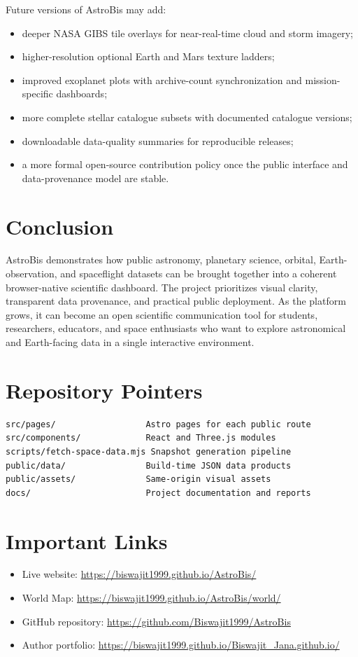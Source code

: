 \documentclass[11pt,a4paper]{article}
\begin{document}
Future versions of AstroBis may add:

\begin{itemize}[leftmargin=*]
  \item deeper NASA GIBS tile overlays for near-real-time cloud and storm imagery;
  \item higher-resolution optional Earth and Mars texture ladders;
  \item improved exoplanet plots with archive-count synchronization and mission-specific dashboards;
  \item more complete stellar catalogue subsets with documented catalogue versions;
  \item downloadable data-quality summaries for reproducible releases;
  \item a more formal open-source contribution policy once the public interface and data-provenance model are stable.
\end{itemize}

\section{Conclusion}

AstroBis demonstrates how public astronomy, planetary science, orbital, Earth-observation, and spaceflight datasets can be brought together into a coherent browser-native scientific dashboard. The project prioritizes visual clarity, transparent data provenance, and practical public deployment. As the platform grows, it can become an open scientific communication tool for students, researchers, educators, and space enthusiasts who want to explore astronomical and Earth-facing data in a single interactive environment.

\appendix
\section{Repository Pointers}

\begin{lstlisting}[style=astrobis]
src/pages/                  Astro pages for each public route
src/components/             React and Three.js modules
scripts/fetch-space-data.mjs Snapshot generation pipeline
public/data/                Build-time JSON data products
public/assets/              Same-origin visual assets
docs/                       Project documentation and reports
\end{lstlisting}

\section{Important Links}

\begin{itemize}[leftmargin=*]
  \item Live website: \url{https://biswajit1999.github.io/AstroBis/}
  \item World Map: \url{https://biswajit1999.github.io/AstroBis/world/}
  \item GitHub repository: \url{https://github.com/Biswajit1999/AstroBis}
  \item Author portfolio: \url{https://biswajit1999.github.io/Biswajit_Jana.github.io/}
\end{itemize}
\end{document}
